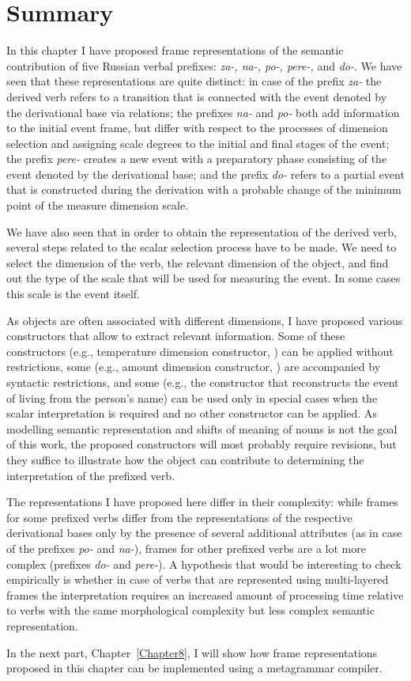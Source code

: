 \section{Summary}
In this chapter I have proposed frame representations of the semantic contribution of five Russian verbal prefixes: \textit{za-, na-, po-, pere-,} and \textit{do-}. We have seen that these representations are quite distinct: in case of the prefix \textit{za-} the derived verb refers to a transition that is connected with the event denoted by the derivational base via relations; the prefixes \textit{na-} and \textit{po-} both add information to the initial event frame, but differ with respect to the processes of dimension selection and assigning scale degrees to the initial and final stages of the event; the prefix \textit{pere-} creates a new event with a preparatory phase consisting of the event denoted by the derivational base; and the prefix \textit{do-} refers to a partial event that is constructed during the derivation with a probable change of the minimum point of the measure dimension scale.

We have also seen that in order to obtain the representation of the derived verb, several steps related to the scalar selection process have to be made. We need to select the dimension of the verb, the relevant dimension of the object, and find out the type of the scale that will be used for measuring the event. In some cases this scale is the event itself. 

As objects are often associated with different dimensions, I have proposed various constructors that allow to extract relevant information. Some of these constructors (e.g., temperature dimension constructor, ) can be applied without restrictions, some (e.g., amount dimension constructor, ) are accompanied by syntactic restrictions, and some (e.g., the constructor that reconstructs the event of living from the person's name) can be used only in special cases when the scalar interpretation is required and no other constructor can be applied. As modelling semantic representation and shifts of meaning of nouns is not the goal of this work, the proposed constructors will most probably require revisions, but they suffice to illustrate how the object can contribute to determining the interpretation of the prefixed verb.

The representations I have proposed here differ in their complexity: while frames for some prefixed verbs differ from the representations of the respective derivational bases only by the presence of several additional attributes (as in case of the prefixes \textit{po-} and \textit{na-}), frames for other prefixed verbs are a lot more complex (prefixes \textit{do-} and \textit{pere-}). A hypothesis that would be interesting to check empirically is whether in case of verbs that are represented using multi-layered frames the interpretation requires an increased amount of processing time relative to verbs with the same morphological complexity but less complex semantic representation.


In the next part, Chapter~\ref{Chapter8}, I will show how frame representations proposed in this chapter can be implemented using a metagrammar compiler.
